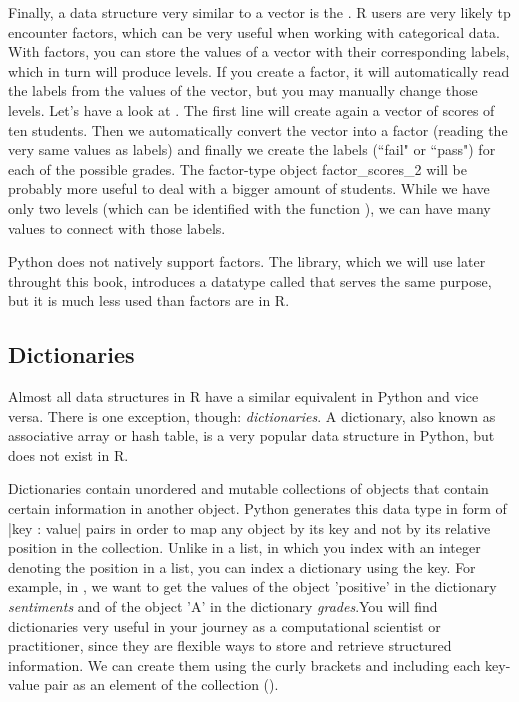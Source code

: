 Finally, a data structure very similar to a vector is the .
R users are very likely tp encounter factors, which can be very useful when
working with categorical data. With factors, you can
store the values of a vector with their corresponding labels, which in
turn will produce levels. If you create a factor, it will
automatically read the labels from the values of the vector, but you
may manually change those levels. Let's have a look at
.  The first line will create again a vector of scores
of ten students. Then we automatically convert the vector into a
factor (reading the very same values as labels) and finally we create
the labels (``fail" or ``pass") for each of the possible grades.  The
factor-type object factor\_scores\_2 will be probably more useful to
deal with a bigger amount of students. While we have only two levels
(which can be identified with the function ), we can have many
values to connect with those labels.


Python does not natively support factors. The  library,
which we will use later throught this book, introduces a datatype called
 that serves the same purpose, but it is much less
used than factors are in R.



\subsection{Dictionaries}
Almost all data structures in R have a similar equivalent in Python
and vice versa. There is one exception, though: \emph{dictionaries}. A
dictionary, also known as associative array or hash table, is a very
popular data structure in Python, but does not exist in R.

Dictionaries contain unordered and mutable collections of objects that
contain certain information in another object. Python generates this
data type in form of |{key : value}| pairs in order
to map any object by its key and not by its relative position in the
collection. Unlike in a list, in which you index with an integer denoting
the position in a list, you can index a dictionary using the key.
For example, in , we want to get the values of the object 'positive' in the
dictionary \emph{sentiments} and of the object 'A' in the dictionary
\emph{grades}.You will
find dictionaries very useful in your journey as a computational
scientist or practitioner, since they are flexible ways to store and
retrieve structured information. We can create them using the curly
brackets {} and including each key-value pair as an element of the
collection ().

